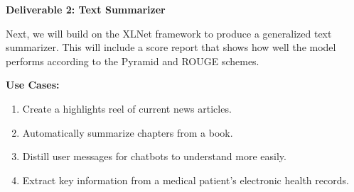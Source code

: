 \vspace{5pt}

\begin{large}
    \noindent\textbf{Deliverable 2: Text Summarizer}
\end{large}

Next, we will build on the XLNet framework to produce a generalized text summarizer.
This will include a score report that shows how well the model performs according to the Pyramid and ROUGE schemes.

\vspace{1pt}

\noindent\textbf{Use Cases:}

\vspace{0pt}

\begin{enumerate}[label=\textbf{\arabic*}, labelsep=0.1em, itemsep=0em, topsep=0em, font=\small]
    \item Create a highlights reel of current news articles.
    \item Automatically summarize chapters from a book.
    \item Distill user messages for chatbots to understand more easily.
    \item Extract key information from a medical patient’s electronic health records.
\end{enumerate}